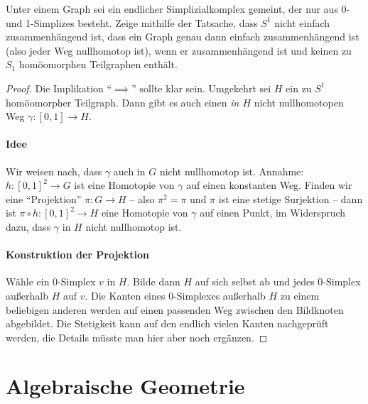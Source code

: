 \documentclass[ngerman, 11pt, a4paper, twoside, abstracton]{scrbook}
\begin{document}
\begin{exercise}
  Unter einem Graph sei ein endlicher Simplizialkomplex gemeint, der nur aus 0- und 1-Simplizes besteht. Zeige mithilfe der Tatsache, dass $S^1$ nicht einfach zusammenhängend ist, dass ein Graph genau dann einfach zusammenhängend ist (also jeder Weg nullhomotop ist), wenn er zusammenhängend ist und keinen zu $S_1$ homöomorphen Teilgraphen enthält.
\end{exercise}
\begin{proof}
  Die Implikation \enquote{$\implies$} sollte klar sein. Umgekehrt sei $H$ ein zu $S^1$ homöomorpher Teilgraph. Dann gibt es auch einen \textit{in $H$} nicht nullhomotopen Weg $\gamma\colon \left[ 0, 1 \right] \to H$.

  \paragraph{Idee} Wir weisen nach, dass $\gamma$ auch in $G$ nicht nullhomotop ist. Annahme: $h\colon \left[ 0, 1 \right]^2 \to G$ ist eine Homotopie von $\gamma$ auf einen konstanten Weg. Finden wir eine \enquote{Projektion} $\pi\colon G \to H$ -- also $\pi^2 = \pi$ und $\pi$ ist eine stetige Surjektion -- dann ist $\pi \circ h\colon \left[ 0, 1 \right]^2 \to H$ eine Homotopie von $\gamma$ auf einen Punkt, im Widerspruch dazu, dass $\gamma$ in $H$ nicht nullhomotop ist.

  \paragraph{Konstruktion der Projektion} Wähle ein 0-Simplex $v$ in $H$. Bilde dann $H$ auf sich selbst ab und jedes 0-Simplex außerhalb $H$ auf $v$. Die Kanten eines 0-Simplexes außerhalb $H$ zu einem beliebigen anderen werden auf einen passenden Weg zwischen den Bildknoten abgebildet. Die Stetigkeit kann auf den endlich vielen Kanten nachgeprüft werden, die Details müsste man hier aber noch ergänzen.
\end{proof}
\section{Algebraische Geometrie}
\end{document}
